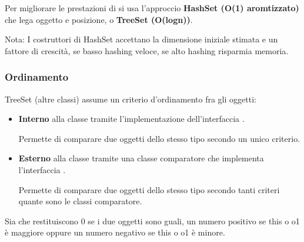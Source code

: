 \bigskip

Per migliorare le prestazioni di  si usa l'approccio \textbf{HashSet (O(1) aromtizzato)} che lega oggetto e posizione, o \textbf{TreeSet (O(logn))}.

Nota: I costruttori di HashSet accettano la dimensione iniziale stimata e un fattore di crescità, se basso hashing veloce, se alto hashing risparmia memoria.

\subsubsection{Ordinamento}
TreeSet (altre classi) assume un criterio d'ordinamento fra gli oggetti:
\begin{itemize}
	\item \textbf{Interno} alla classe tramite l'implementazione dell'interfaccia .

	Permette di comparare due oggetti dello stesso tipo secondo un unico criterio.


	\item \textbf{Esterno} alla classe tramite una classe comparatore che implementa l'interfaccia .

	Permette di comparare due oggetti dello stesso tipo secondo tanti criteri quante sono le classi comparatore.

\end{itemize}

Sia  che  restituiscono 0 se i due oggetti sono guali, un numero positivo se this o o1 è maggiore oppure un numero negativo se this o o1 è minore.